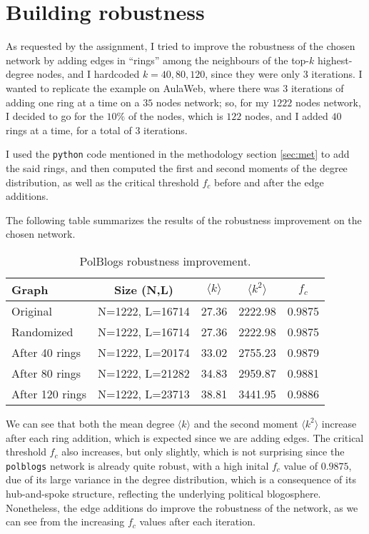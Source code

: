 \documentclass{article}
\begin{document}
\section{Building robustness}\label{sec:building}
As requested by the assignment, I tried to improve the robustness of the chosen network by adding edges in “rings” among the neighbours of the top-$k$ highest-degree nodes, and I hardcoded $k=40, 80, 120$, since they were only 3 iterations.
I wanted to replicate the example on AulaWeb, where there was 3 iterations of adding one ring at a time on a $35$ nodes network; so, for my $1222$ nodes network, I decided to go for the $10\%$ of the nodes, which is $122$ nodes, and I added $40$ rings at a time, for a total of $3$ iterations.

I used the \texttt{python} code mentioned in the methodology section \ref{sec:met} to add the said rings, and then computed the first and second moments of the degree distribution, as well as the critical threshold $f_c$ before and after the edge additions.

The following table summarizes the results of the robustness improvement on the chosen network.

\begin{table}[H]
  \centering
  \caption{PolBlogs robustness improvement.}\label{tab:polblogs:improv}
  \begin{tabular}{lcccc}
    \toprule
    Graph & Size (N,L) & $\langle k\rangle$ & $\langle k^2\rangle$ & $f_c$ \\
    \midrule
    Original         & N=1222, L=16714 & 27.36 & 2222.98 & 0.9875 \\
    Randomized       & N=1222, L=16714 & 27.36 & 2222.98 & 0.9875 \\
    After 40 rings   & N=1222, L=20174 & 33.02 & 2755.23 & 0.9879 \\
    After 80 rings   & N=1222, L=21282 & 34.83 & 2959.87 & 0.9881 \\
    After 120 rings  & N=1222, L=23713 & 38.81 & 3441.95 & 0.9886 \\
    \bottomrule
  \end{tabular}
   \label{tab:polblogs:summary}
\end{table}

We can see that both the mean degree $\langle k\rangle$ and the second moment $\langle k^2\rangle$ increase after each ring addition, which is expected since we are adding edges.
% 
% 
The critical threshold $f_c$ also increases, but only slightly, which is not surprising since the \texttt{polblogs} network is already quite robust, with a high inital $f_c$ value of $0.9875$, due of its large variance in the degree distribution, which is a consequence of its hub-and-spoke structure, reflecting the underlying political blogosphere.
Nonetheless, the edge additions do improve the robustness of the network, as we can see from the increasing $f_c$ values after each iteration.
\end{document}
